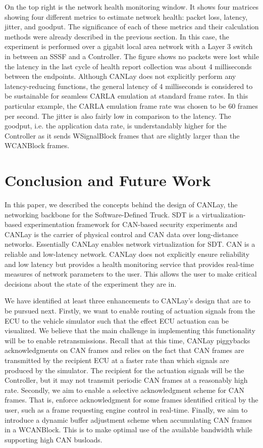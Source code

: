 \documentclass[letterpaper,twocolumn,12pt]{article}
\begin{document}
On the top right is the network health monitoring window. It shows four matrices showing
four different metrics to estimate network health: packet loss, latency, jitter, and goodput. The significance of each of these metrics and their calculation methods were already described in the previous section. In this case, the experiment is performed over a gigabit local area network with a Layer 3 switch in between an SSSF and a Controller. The figure shows no packets were lost while the latency in the last cycle of health report collection was about 4 milliseconds between the endpoints. Although CANLay does not explicitly perform any latency-reducing functions, the general latency of 4 milliseconds is considered to be sustainable for seamless CARLA emulation at standard frame rates. In this particular example, the CARLA emulation frame rate was chosen to be 60 frames per second. The jitter is also fairly low in comparison to the latency. The goodput, i.e. the application data rate, is understandably higher for the Controller as it sends WSignalBlock frames that are slightly larger than the WCANBlock frames. 

\section{Conclusion and Future Work}
In this paper, we described the concepts behind the design of CANLay, the networking backbone for the Software-Defined Truck. 
SDT is a virtualization-based experimentation framework for CAN-based security experiments and CANLay is the carrier of physical control and CAN data over long-distance networks. Essentially CANLay enables network virtualization for SDT. CAN is a reliable and low-latency network. CANLay does not explicitly ensure reliability and low latency but provides a health monitoring service that provides real-time measures of network parameters to the user. This allows the user to make critical decisions about the state of the experiment they are in.

We have identified at least three enhancements to CANLay's design that are to be pursued next. 
Firstly, we want to enable routing of actuation signals from the ECU to the vehicle simulator such that the effect ECU actuation can be visualized. We believe that the main challenge in implementing this functionality will be to enable retransmissions. Recall that at this time, CANLay piggybacks acknowledgments on CAN frames and relies on the fact that CAN frames are transmitted by the recipient ECU at a faster rate than which signals are produced by the simulator. The recipient for the actuation signals will be the Controller, but it may not transmit periodic CAN frames at a reasonably high rate. 
Secondly, we aim to enable a selective acknowledgment scheme for CAN frames. That is, enforce acknowledgment for some frames identified critical by the user, such as a frame requesting engine control in real-time. 
Finally, we aim to introduce a dynamic buffer adjustment scheme when accumulating CAN frames in a WCANBlock. This is to make optimal use of the available bandwidth while supporting high CAN busloads.

 



\end{document}
